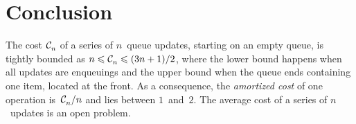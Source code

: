 \section{Conclusion}

The cost \(\mathcal{C}_{n}^{}\) of a series of \(n\)~queue updates, starting on
an empty queue, is tightly bounded as \(n \leqslant \mathcal{C}_{n}^{} \leqslant
(3n+1)/2\), where the lower bound happens when all updates are
enqueuings and the upper bound when the queue ends containing one
item, located at the front. As a consequence, the \emph{amortized
  cost} of one operation is~\(\mathcal{C}_{n}^{}/n\) and lies between
\(1\)~and~\(2\). The average cost of a series of \(n\)~updates is an
open problem.
